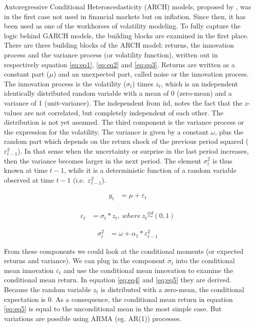 \documentclass[a4paper, twoside]{templates/ociamthesis}
\begin{document}
\noindent Autoregressive Conditional Heteroscedasticity (ARCH) models, proposed by \textcite{engle1982}, was in the first case not used in financial markets but on inflation. Since then, it has been used as one of the workhorses of volatility modeling. To fully capture the logic behind GARCH models, the building blocks are examined in the first place. There are three building blocks of the ARCH model: returns, the innovation process and the variance process (or volatility function), written out in respectively equation \eqref{eq:eq1}, \eqref{eq:eq2} and \eqref{eq:eq3}. Returns are written as a constant part (\(\mu\)) and an unexpected part, called noise or the innovation process. The innovation process is the volatility (\(\sigma_t\)) times \(z_t\), which is an independent identically distributed random variable with a mean of 0 (zero-mean) and a variance of 1 (unit-variance). The independent from iid, notes the fact that the \(z\)-values are not correlated, but completely independent of each other. The distribution is not yet assumed. The third component is the variance process or the expression for the volatility. The variance is given by a constant \(\omega\), plus the random part which depends on the return shock of the previous period squared (\(\varepsilon_{t-1}^2\)). In that sense when the uncertainty or surprise in the last period increases, then the variance becomes larger in the next period. The element \(\sigma_t^2\) is thus known at time \(t-1\), while it is a deterministic function of a random variable observed at time \(t-1\) (i.e.~\(\varepsilon_{t-1}^2\)).

\begin{align} 
y_{t} &= \mu + \varepsilon_t
 \label{eq:eq1}
\end{align}

\begin{align} 
\varepsilon_{t} &= \sigma_t * z_t, \ where \ z_t \stackrel{iid}{\sim} (0,1)
 \label{eq:eq2}
\end{align} 

\begin{align} 
\sigma_{t}^{2} &= \omega + \alpha_1 *  \varepsilon_{t-1}^2 
 \label{eq:eq3}
\end{align}

\newpage

\noindent From these components we could look at the conditional moments (or expected returns and variance). We can plug in the component \(\sigma_t\) into the conditional mean innovation \(\varepsilon_{t}\) and use the conditional mean innovation to examine the conditional mean return. In equation \eqref{eq:eq4} and \eqref{eq:eq5} they are derived. Because the random variable \(z_t\) is distributed with a zero-mean, the conditional expectation is 0. As a consequence, the conditional mean return in equation \eqref{eq:eq5} is equal to the unconditional mean in the most simple case. But variations are possible using ARMA (eg. AR(1)) processes.
\end{document}
